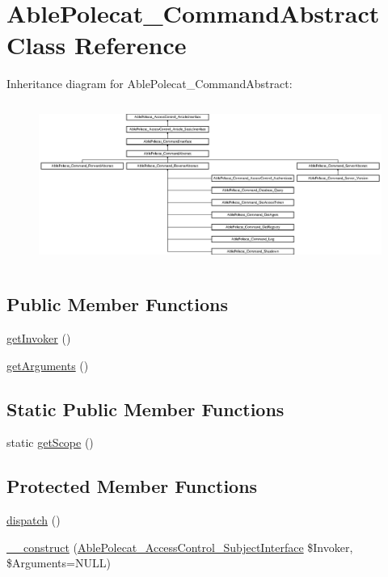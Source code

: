 \hypertarget{class_able_polecat___command_abstract}{}\section{Able\+Polecat\+\_\+\+Command\+Abstract Class Reference}
\label{class_able_polecat___command_abstract}
Inheritance diagram for Able\+Polecat\+\_\+\+Command\+Abstract\+:\begin{figure}[H]
\begin{center}
\leavevmode
\includegraphics[height=5.299685cm]{class_able_polecat___command_abstract}
\end{center}
\end{figure}
\subsection*{Public Member Functions}
\begin{DoxyCompactItemize}
\item 
\hyperlink{class_able_polecat___command_abstract_a059205d72a39460f114b68e5fa2b23b6}{get\+Invoker} ()
\item 
\hyperlink{class_able_polecat___command_abstract_a1d4c324c5a088be98d99d3efbf3502e1}{get\+Arguments} ()
\end{DoxyCompactItemize}
\subsection*{Static Public Member Functions}
\begin{DoxyCompactItemize}
\item 
static \hyperlink{class_able_polecat___command_abstract_ad9ade868bd136d32967059d1cccb3e92}{get\+Scope} ()
\end{DoxyCompactItemize}
\subsection*{Protected Member Functions}
\begin{DoxyCompactItemize}
\item 
\hyperlink{class_able_polecat___command_abstract_ac9b4976d41cd6b50add18c46b165c03d}{dispatch} ()
\item 
\hyperlink{class_able_polecat___command_abstract_aec46ffdcdc47cd345c45fade177821b2}{\+\_\+\+\_\+construct} (\hyperlink{interface_able_polecat___access_control___subject_interface}{Able\+Polecat\+\_\+\+Access\+Control\+\_\+\+Subject\+Interface} \$Invoker, \$Arguments=N\+U\+L\+L)
\end{DoxyCompactItemize}
